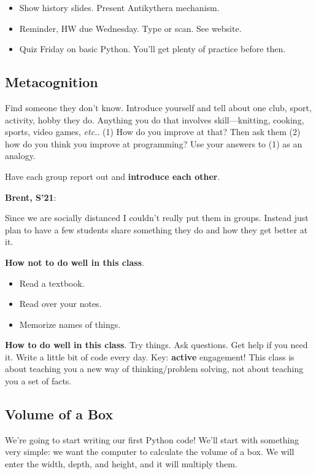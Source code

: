 \documentclass{article}
\newenvironment{reflect}[1]
{
  \noindent
  \begin{lrbox}{\reflectbox}
    \begin{minipage}[t]{\textwidth}
      \textbf{#1}:
}{
    \end{minipage}
  \end{lrbox}
  \fbox{\usebox{\reflectbox}}
}
\begin{document}
\begin{itemize}
\item Show history slides.  Present Antikythera mechanism.
\item Reminder, HW due Wednesday.  Type or scan.  See website.
\item Quiz Friday on basic Python.  You'll get plenty of practice
  before then.
\end{itemize}

\subsection*{Metacognition}

Find someone they don't know.  Introduce yourself and tell about one
club, sport, activity, hobby they do.  Anything you do that
involves skill---knitting, cooking, sports, video games, \emph{etc.}.
(1) How do you improve at that?  Then ask them (2) how do you think
you improve at programming? Use your answers to (1) as an analogy.

Have each group report out and \textbf{introduce each other}.

\begin{reflect}{Brent, S'21}
  Since we are socially distanced I couldn't really put them in
  groups.  Instead just plan to have a few students share something
  they do and how they get better at it.
\end{reflect}

\textbf{How not to do well in this class}.
\begin{itemize}
\item Read a textbook.
\item Read over your notes.
\item Memorize names of things.
\end{itemize}

\textbf{How to do well in this class}.  Try things.  Ask questions.
Get help if you need it.  Write a little bit of code every day.  Key:
\textbf{active} engagement!  This class is about teaching you a new
way of thinking/problem solving, not about teaching you a set of
facts.

\subsection*{Volume of a Box}

We're going to start writing our first Python code!  We'll start with
something very simple: we want the computer to calculate the volume of
a box.  We will enter the width, depth, and height, and it will
multiply them.
\end{document}
